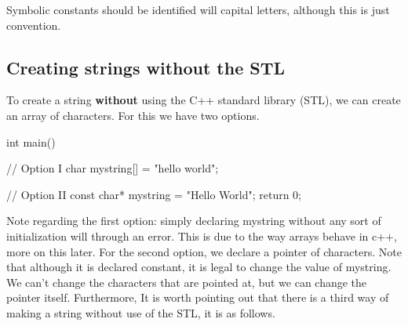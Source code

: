 \documentclass{report}
\begin{document}
%     
%     
%     
%     
    \begin{notebox}
			Symbolic constants should be identified will capital letters, although this is just convention.
		\end{notebox}
    \pagebreak \bigbreak \noindent 
    \subsection{Creating strings without the STL}
    To create a string \textbf{without} using the C++ standard library (STL), we can create an array of characters. For this we have two options.
    \bigbreak \noindent 
    
    \begin{cppcode}
int main() {

    // Option I
    char mystring[] = "hello world";

    // Option II
    const char* mystring = "Hello World";
    return 0;
}
    \end{cppcode}
    
    \bigbreak \noindent 
    Note regarding the first option: simply declaring mystring without any sort of initialization will through an error. This is due to the way arrays behave in c++, more on this later.
    \bigbreak \noindent 
    For the second option, we declare a pointer of characters. Note that although it is declared constant, it is legal to change the value of mystring. We can't change the characters that are pointed at, but we can change the pointer itself.
    \bigbreak \noindent 
    Furthermore, It is worth pointing out that there is a third way of making a string without use of the STL, it is as follows.
    \bigbreak \noindent 
    
\end{document}
